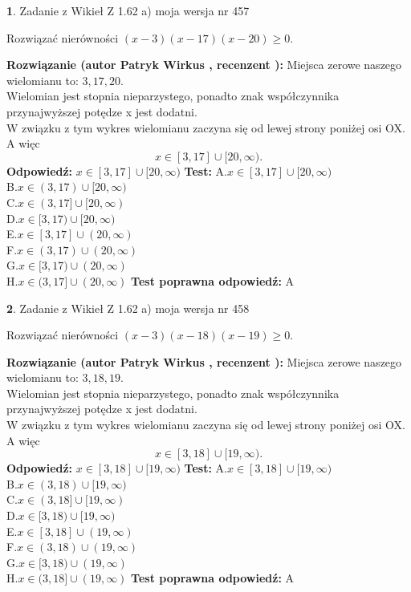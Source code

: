 \documentclass[12pt, a4paper]{article}
\theoremstyle{definition} %
\newtheorem{zad}{}
\newcommand{\zadStart}[1]{\begin{zad}#1\newline}
\newcommand{\zadStop}{\end{zad}}
\newcommand{\rozwStart}[2]{\noindent \textbf{Rozwiązanie (autor #1 , recenzent #2): }\newline}
\newcommand{\rozwStop}{\newline}
\newcommand{\odpStart}{\noindent \textbf{Odpowiedź:}\newline}
\newcommand{\odpStop}{\newline}
\newcommand{\testStart}{\noindent \textbf{Test:}\newline}
\newcommand{\testStop}{\newline}
\newcommand{\kluczStart}{\noindent \textbf{Test poprawna odpowiedź:}\newline}
\newcommand{\kluczStop}{\newline}
\begin{document}
\zadStart{Zadanie z Wikieł Z 1.62 a) moja wersja nr 457}

Rozwiązać nierówności $(x-3)(x-17)(x-20)\ge0$.
\zadStop
\rozwStart{Patryk Wirkus}{}
Miejsca zerowe naszego wielomianu to: $3, 17, 20$.\\
Wielomian jest stopnia nieparzystego, ponadto znak współczynnika przy\linebreak najwyższej potędze x jest dodatni.\\ W związku z tym wykres wielomianu zaczyna się od lewej strony poniżej osi OX. A więc $$x \in [3,17] \cup [20,\infty).$$
\rozwStop
\odpStart
$x \in [3,17] \cup [20,\infty)$
\odpStop
\testStart
A.$x \in [3,17] \cup [20,\infty)$\\
B.$x \in (3,17) \cup [20,\infty)$\\
C.$x \in (3,17] \cup [20,\infty)$\\
D.$x \in [3,17) \cup [20,\infty)$\\
E.$x \in [3,17] \cup (20,\infty)$\\
F.$x \in (3,17) \cup (20,\infty)$\\
G.$x \in [3,17) \cup (20,\infty)$\\
H.$x \in (3,17] \cup (20,\infty)$
\testStop
\kluczStart
A
\kluczStop



\zadStart{Zadanie z Wikieł Z 1.62 a) moja wersja nr 458}

Rozwiązać nierówności $(x-3)(x-18)(x-19)\ge0$.
\zadStop
\rozwStart{Patryk Wirkus}{}
Miejsca zerowe naszego wielomianu to: $3, 18, 19$.\\
Wielomian jest stopnia nieparzystego, ponadto znak współczynnika przy\linebreak najwyższej potędze x jest dodatni.\\ W związku z tym wykres wielomianu zaczyna się od lewej strony poniżej osi OX. A więc $$x \in [3,18] \cup [19,\infty).$$
\rozwStop
\odpStart
$x \in [3,18] \cup [19,\infty)$
\odpStop
\testStart
A.$x \in [3,18] \cup [19,\infty)$\\
B.$x \in (3,18) \cup [19,\infty)$\\
C.$x \in (3,18] \cup [19,\infty)$\\
D.$x \in [3,18) \cup [19,\infty)$\\
E.$x \in [3,18] \cup (19,\infty)$\\
F.$x \in (3,18) \cup (19,\infty)$\\
G.$x \in [3,18) \cup (19,\infty)$\\
H.$x \in (3,18] \cup (19,\infty)$
\testStop
\kluczStart
A
\kluczStop
\end{document}
